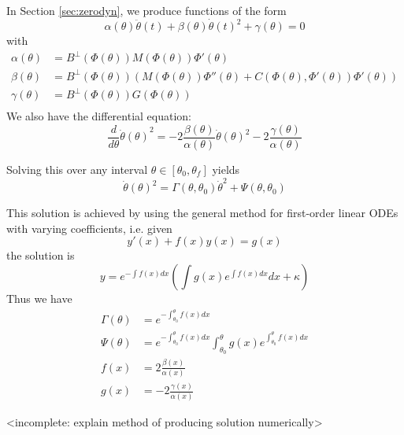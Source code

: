 In Section \ref{sec:zerodyn}, we produce functions of the form
\[
\alpha\left(\theta\right)\ddot{\theta}(t) + \beta\left(\theta\right)\dot{\theta}(t)^2 + \gamma\left(\theta\right) = 0
\]
with
\begin{align*}
	\alpha(\theta) &= B^{\bot}\left(\Phi(\theta)\right)M\left(\Phi(\theta)\right)\Phi'(\theta)\\
	\beta(\theta) &= B^{\bot}\left(\Phi(\theta)\right)\left(M\left(\Phi(\theta)\right)\Phi''(\theta)
	+C\left(\Phi(\theta),\Phi'(\theta)\right)\Phi'(\theta) \right)\\
	\gamma(\theta) &= B^{\bot}\left(\Phi(\theta)\right)G\left(\Phi(\theta)\right)\\
\end{align*}
We also have the differential equation:
\[
\frac{d}{d\theta}{\dot{\theta}\left(\theta\right)}^2 = -2\frac{\beta\left(\theta\right)}
{\alpha\left(\theta\right)}\dot{\theta}\left(\theta\right)^2 - 2\frac{\gamma\left(\theta\right)}
{\alpha\left(\theta\right)}
\]

Solving this over any interval $\theta \in \left[\theta_0,\theta_f\right]$ yields
\[
\dot{\theta}\left(\theta\right)^2 = \Gamma\left(\theta,\theta_0\right)\dot{\theta}^2 
+ \Psi\left(\theta, \theta_0\right)
\]

This solution is achieved by using the general method for first-order linear ODEs with varying coefficients, i.e. given
\begin{equation*}
y'(x) + f(x)y(x) = g(x)
\end{equation*}
the solution is
\begin{equation*}
y = e^{-\int f(x)dx}\left(\int g(x)e^{\int f(x)dx}dx + \kappa\right)
\end{equation*}
Thus we have
\begin{subequations}
	\begin{align}
	\Gamma(\theta) &= e^{-\int_{\theta_0}^{\theta}f(x)dx} \\
	\Psi(\theta) &= e^{-\int_{\theta_0}^{\theta}f(x)dx}
	\int_{\theta_0}^{\theta}g(x)e^{\int_{\theta_0}^{\theta}f(x)dx} \\
	f(x) &= 2\frac{\beta(x)}{\alpha(x)} \\
	g(x) &= -2\frac{\gamma(x)}{\alpha(x)}
	\end{align}
\end{subequations}

{\color{red}<incomplete: explain method of producing solution numerically>}